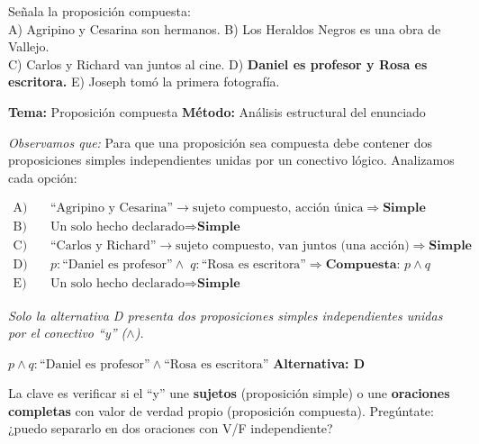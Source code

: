 \begin{tcolorbox}[
  enhanced, breakable,
  colback=GrisClaro, colframe=AzulPizarra,
  fonttitle=\bfseries\sffamily,
  title={Ejercicio 1 — Proposición compuesta},
  arc=3pt, boxrule=0.8pt
]

\begin{problema}
Señala la proposición compuesta:\\
A) Agripino y Cesarina son hermanos.\quad
B) Los Heraldos Negros es una obra de Vallejo.\\
C) Carlos y Richard van juntos al cine.\quad
D) \textbf{Daniel es profesor y Rosa es escritora.}\quad
E) Joseph tomó la primera fotografía.
\end{problema}

\smallskip
\noindent
\textbf{\sffamily\color{AzulMedio}Tema:} Proposición compuesta \hfill
\textbf{\sffamily\color{AzulMedio}Método:} Análisis estructural del enunciado

\medskip
\noindent\textit{Observamos que:} Para que una proposición sea compuesta debe contener dos proposiciones simples independientes unidas por un conectivo lógico. Analizamos cada opción:

\begin{align*}
  \text{A)}\quad & \text{``Agripino y Cesarina''} \rightarrow \text{sujeto compuesto, acción única} \Rightarrow \textbf{Simple} \\
  \text{B)}\quad & \text{Un solo hecho declarado} \Rightarrow \textbf{Simple} \\
  \text{C)}\quad & \text{``Carlos y Richard''} \rightarrow \text{sujeto compuesto, van juntos (una acción)} \Rightarrow \textbf{Simple} \\
  \text{D)}\quad & p: \text{``Daniel es profesor''} \wedge\; q: \text{``Rosa es escritora''} \Rightarrow \textbf{Compuesta: } p \wedge q \\
  \text{E)}\quad & \text{Un solo hecho declarado} \Rightarrow \textbf{Simple}
\end{align*}

\noindent\textit{Solo la alternativa D presenta dos proposiciones simples independientes unidas por el conectivo ``y'' ($\wedge$).}

\begin{tcolorbox}[colback=AzulClaro!60, colframe=AzulPizarra, arc=2pt, boxrule=0.8pt, left=8pt, right=8pt]
\centering
$\displaystyle \boxed{p \wedge q: \text{``Daniel es profesor''} \wedge \text{``Rosa es escritora''}}$ \quad \textbf{Alternativa: D}
\end{tcolorbox}

\begin{cajatip}
La clave es verificar si el ``y'' une \textbf{sujetos} (proposición simple) o une \textbf{oraciones completas} con valor de verdad propio (proposición compuesta). Pregúntate: ¿puedo separarlo en dos oraciones con V/F independiente?
\end{cajatip}
\end{tcolorbox}

